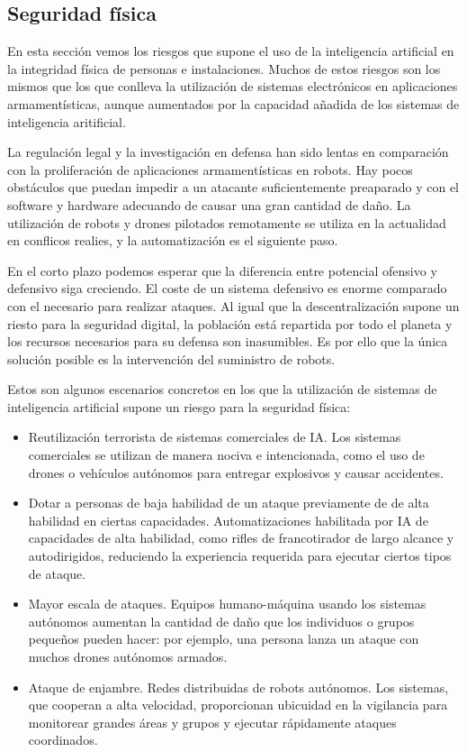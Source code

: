 \documentclass[12pt,a4paper]{article}
\begin{document}
\subsection{Seguridad física}

En esta sección vemos los riesgos que supone el uso de la inteligencia artificial en la integridad física de personas e instalaciones. Muchos de estos riesgos son los mismos que los que conlleva la utilización de sistemas electrónicos en aplicaciones armamentísticas, aunque aumentados por la capacidad añadida de los sistemas de inteligencia aritificial.

La regulación legal y la investigación en defensa han sido lentas en comparación con la proliferación de aplicaciones armamentísticas en robots. Hay pocos obstáculos que puedan impedir a un atacante suficientemente preaparado y con el software y hardware adecuando de causar una gran cantidad de daño. La utilización de robots y drones pilotados remotamente se utiliza en la actualidad en conflicos realies, y la automatización es el siguiente paso.

En el corto plazo podemos esperar que la diferencia entre potencial ofensivo y defensivo siga creciendo. El coste de un sistema defensivo es enorme comparado con el necesario para realizar ataques. Al igual que la descentralización supone un riesto para la seguridad digital, la población está repartida por todo el planeta y los recursos necesarios para su defensa son inasumibles. Es por ello que la única solución posible es la intervención del suministro de robots.

Estos son algunos escenarios concretos en los que la utilización de sistemas de inteligencia artificial supone un riesgo para la seguridad física:

\begin{itemize}

\item Reutilización terrorista de sistemas comerciales de IA. Los sistemas comerciales se utilizan de manera nociva e intencionada, como el uso de drones o vehículos autónomos para entregar explosivos y causar accidentes.

\item Dotar a personas de baja habilidad de un ataque previamente de de alta habilidad en ciertas capacidades. Automatizaciones habilitada por IA de capacidades de alta habilidad, como rifles de francotirador de largo alcance y autodirigidos, reduciendo la experiencia requerida para ejecutar ciertos tipos de ataque.

\item Mayor escala de ataques. Equipos humano-máquina usando los sistemas autónomos aumentan la cantidad de daño que los individuos o grupos pequeños pueden hacer: por ejemplo, una persona lanza un ataque con muchos drones autónomos armados.

\item Ataque de enjambre. Redes distribuidas de robots autónomos. Los sistemas, que cooperan a alta velocidad, proporcionan ubicuidad en la vigilancia para monitorear grandes áreas y grupos y ejecutar rápidamente ataques coordinados.

\end {itemize}
\end{document}
